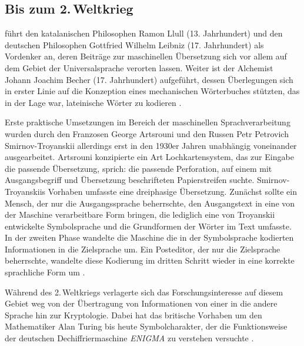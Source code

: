 \subsection{Bis zum 2.\,Weltkrieg}
\label{K3:para:2WK}

\citet[5]{stein_machine_2013} führt den katalanischen Philosophen Ramon Llull (13. Jahrhundert) und den deutschen Philosophen Gottfried Wilhelm Leibniz (17. Jahrhundert) als Vordenker an, deren Beiträge zur maschinellen Übersetzung sich vor allem auf dem Gebiet der Universalsprache verorten lassen. Weiter ist der Alchemist Johann Joachim Becher (17. Jahrhundert) aufgeführt, dessen Überlegungen sich in erster Linie auf die Konzeption eines mechanischen Wörterbuches stützten, das in der Lage war, lateinische Wörter zu kodieren \citep[5]{stein_machine_2013}.

\begin{sloppypar}
Erste praktische Umsetzungen im Bereich der maschinellen Sprachverarbeitung wurden durch den Franzosen George Artsrouni und den Russen Petr Petrovich Smirnov-Troyanskii allerdings erst in den 1930er Jahren unabhängig voneinander ausgearbeitet. Artsrouni konzipierte ein Art Lochkartensystem, das zur Eingabe die passende Übersetzung, sprich: die passende Perforation, auf einem mit Ausgangsbegriff und Übersetzung beschrifteten Papierstreifen suchte. Smir\-nov-Troy\-ans\-kiis Vorhaben umfasste eine dreiphasige Übersetzung. Zunächst sollte ein Mensch, der nur die Ausgangssprache beherrschte, den Ausgangstext in eine von der Maschine verarbeitbare Form bringen, die lediglich eine von Troyanskii entwickelte Symbolsprache und die Grundformen der Wörter im Text umfasste. In der zweiten Phase wandelte die Maschine die in der Symbolsprache kodierten Informationen in die Zielsprache um. Ein Posteditor, der nur die Zielsprache beherrschte, wandelte diese Kodierung im dritten Schritt wieder in eine korrekte sprachliche Form um \citep[434]{hutchins_machine_1995}.\end{sloppypar}

Während des 2.\,Weltkriegs verlagerte sich das Forschungsinteresse auf diesem Gebiet weg von der Übertragung von Informationen von einer in die andere Sprache hin zur Kryptologie. Dabei hat das britische Vorhaben um den Mathematiker Alan Turing bis heute Symbolcharakter, der die Funktionsweise der deutschen Dechiffriermaschine \emph{ENIGMA} zu verstehen versuchte \citep[6]{stein_machine_2013}.

